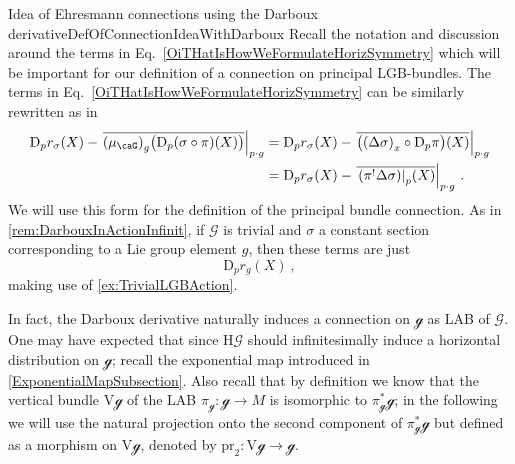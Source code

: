\documentclass[reqno,a4paper,oneside]{amsart}
\newcommand\mutot{\mu_\caG}
\theoremstyle{plain}
\theoremstyle{remark}
\theoremstyle{definition}
\begin{document}
\begin{remarks}{Idea of Ehresmann connections using the Darboux derivative}{DefOfConnectionIdeaWithDarboux}
Recall the notation and discussion around the terms in Eq.\ \eqref{OiTHatIsHowWeFormulateHorizSymmetry} which will be important for our definition of a connection on principal LGB-bundles. The terms in Eq.\ \eqref{OiTHatIsHowWeFormulateHorizSymmetry} can be similarly rewritten as in
\begin{align*}
\mathrm{D}_pr_\sigma\mleft( 
	X 
\mright)
	- \mleft.{\overline{
		\mleft( \mutot\mright)_g \bigl(
		\mathrm{D}_p (\sigma \circ \pi)(X)
	\bigr)
	}}\mright|_{p \cdot g}
&=
\mathrm{D}_pr_\sigma\mleft( 
	X 
\mright)
	- \mleft.{\overline{
		\bigl(\mleft(\Delta\sigma\mright)_x \circ \mathrm{D}_p\pi\bigr) (X)
	}}\mright|_{p \cdot g}
\\
&=
\mathrm{D}_pr_\sigma\mleft( 
	X 
\mright)
	- \mleft.{\overline{
		\mleft. \mleft( \pi^!\Delta\sigma \mright) \mright|_p(X)
	}}\mright|_{p \cdot g}~.
\end{align*}
We will use this form for the definition of the principal bundle connection. As in \ref{rem:DarbouxInActionInfinit}, if $\mathcal{G}$ is trivial and $\sigma$ a constant section corresponding to a Lie group element $g$, then these terms are just
\begin{equation*}
\mathrm{D}_p r_g (X)~,
\end{equation*}
making use of \ref{ex:TrivialLGBAction}.
\end{remarks}


In fact, the Darboux derivative naturally induces a connection on $\mathcal{g}$ as LAB of $\mathcal{G}$. One may have expected that since $\mathrm{H}\mathcal{G}$ should infinitesimally induce a horizontal distribution on $\mathcal{g}$; recall the exponential map introduced in \ref{ExponentialMapSubsection}. Also recall that by definition we know that the vertical bundle $\mathrm{V}\mathcal{g}$ of the LAB $\pi_{\mathcal{g}}\colon\mathcal{g} \to M$ is isomorphic to $\pi_{\mathcal{g}}^*\mathcal{g}$; in the following we will use the natural projection onto the second component of $\pi_{\mathcal{g}}^*\mathcal{g}$ but defined as a morphism on $\mathrm{V}\mathcal{g}$, denoted by $\mathrm{pr}_2\colon \mathrm{V}\mathcal{g} \to \mathcal{g}$.
\end{document}
